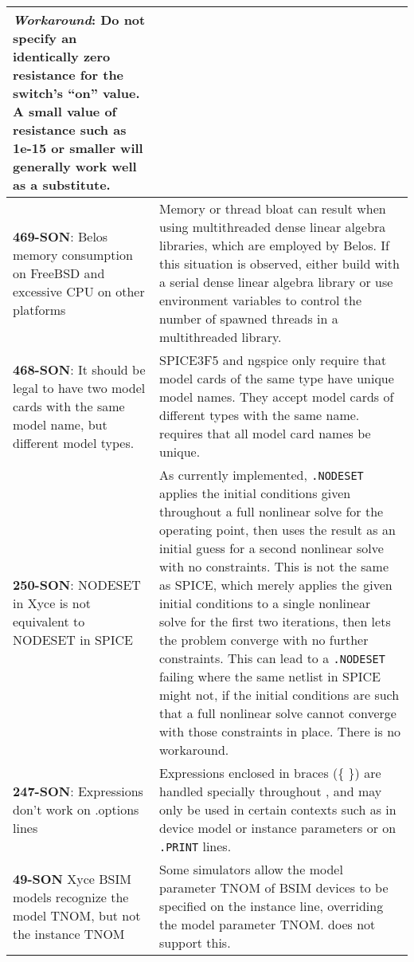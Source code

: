 {\begin{longtable}[h] {>{\raggedright\small}m{2in}|>{\raggedright\let\\\tabularnewline\small}m{3.5in}}
\textbf{\textit{Workaround}}: Do not specify an identically zero resistance for the switch's ``on'' value.  A small value of resistance such as 1e-15 or smaller will generally work well as a substitute. \\ \hline


\textbf{469-SON}: Belos memory consumption on FreeBSD and excessive CPU on other
platforms &
Memory or thread bloat can result when using multithreaded dense linear algebra
libraries, which are employed by Belos.  If this situation is observed, either build
\Xyce{} with a serial dense linear algebra library or use environment variables to control
the number of spawned threads in a multithreaded library.
\\ \hline


\textbf{468-SON}: It should be legal to have two model cards with the same model
name, but different model types. & SPICE3F5 and ngspice only require that
model cards of the same type have unique model names. They accept model cards
of different types with the same name.  \Xyce{} requires that all model card names be unique.
\\ \hline


\textbf{250-SON}: NODESET in Xyce is not equivalent to NODESET in SPICE & As
currently implemented, \texttt{.NODESET} applies the initial conditions given throughout
a full nonlinear solve for the operating point, then uses the result as an
initial guess for a second nonlinear solve with no constraints.  This is not
the same as SPICE, which merely applies the given initial conditions to a
single nonlinear solve for the first two iterations, then lets the problem
converge with no further constraints.  This can lead to a \Xyce{} \texttt{.NODESET} failing
where the same netlist in SPICE might not, if the initial conditions are such
that a full nonlinear solve cannot converge with those constraints in place.
There is no workaround.
\\ \hline

\textbf{247-SON}: Expressions don't work on .options lines & Expressions enclosed
in braces (\{ \}) are handled specially throughout \Xyce{}, and may only be used
in certain contexts such as in device model or instance parameters or on
\texttt{.PRINT} lines.
\\ \hline


\textbf{49-SON} Xyce BSIM models recognize the model TNOM, but not the
instance TNOM & Some simulators allow the model parameter TNOM of BSIM devices to be specified on the instance line, overriding the model parameter TNOM.  \Xyce{} does not support this.
\\ \hline


\end{longtable}}
